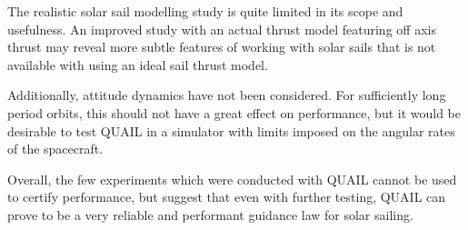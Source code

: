 The realistic solar sail modelling study is quite limited in its scope and usefulness. An improved study with an actual thrust model featuring off axis thrust may reveal more subtle features of working with solar sails that is not available with using an ideal sail thrust model.

Additionally, attitude dynamics have not been considered. For sufficiently long period orbits, this should not have a great effect on performance, but it would be desirable to test QUAIL in a simulator with limits imposed on the angular rates of the spacecraft.

Overall, the few experiments which were conducted with QUAIL cannot be used to certify performance, but suggest that even with further testing, QUAIL can prove to be a very reliable and performant guidance law for solar sailing.